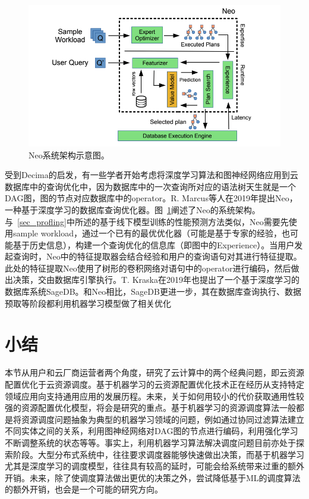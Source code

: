 \begin{figure}[h]
    \centerline{\includegraphics[width=\textwidth]{figures/neo-arch.png}}
    \caption{Neo系统架构示意图。}
    \label{neo_arch}
\end{figure}

受到Decima的启发，有一些学者开始考虑将深度学习算法和图神经网络应用到云数据库中的查询优化中，因为数据库中的一次查询所对应的语法树天生就是一个DAG图，图的节点对应数据库中的operator。R. Marcus等人在2019年提出Neo\parencite{marcus2019neo}，一种基于深度学习的数据库查询优化器。图~\ref{neo_arch}阐述了Neo的系统架构。与~\ref{sec_profling}中所述的基于线下模型训练的性能预测方法类似，Neo需要先使用sample workload，通过一个已有的最优优化器（可能是基于专家的经验，也可能基于历史信息），构建一个查询优化的信息库（即图中的Experience）。当用户发起查询时，Neo中的特征提取器会结合经验和用户的查询语句对其进行特征提取。此处的特征提取Neo使用了树形的卷积网络对语句中的operator进行编码，然后做出决策，交由数据库引擎执行。T. Kraska在2019年也提出了一个基于深度学习的数据库系统SageDB\parencite{47669}。和Neo相比，SageDB更进一步，其在数据库查询执行、数据预取等阶段都利用机器学习模型做了相关优化

\section{小结}

本节从用户和云厂商运营者两个角度，研究了云计算中的两个经典问题，即云资源配置优化于云资源调度。基于机器学习的云资源配置优化技术正在经历从支持特定领域应用向支持通用应用的发展历程。未来，关于如何用较小的代价获取通用性较强的资源配置优化模型，将会是研究的重点。基于机器学习的资源调度算法一般都是将资源调度问题抽象为典型的机器学习领域的问题，例如通过协同过滤算法建立不同实体之间的关系，利用图神经网络对DAG图的节点进行编码，利用强化学习不断调整系统的状态等等。事实上，利用机器学习算法解决调度问题目前亦处于探索阶段。大型分布式系统中，往往要求调度器能够快速做出决策，而基于机器学习尤其是深度学习的调度模型，往往具有较高的延时，可能会给系统带来过重的额外开销。未来，除了使调度算法做出更优的决策之外，尝试降低基于ML的调度算法的额外开销，也会是一个可能的研究方向。